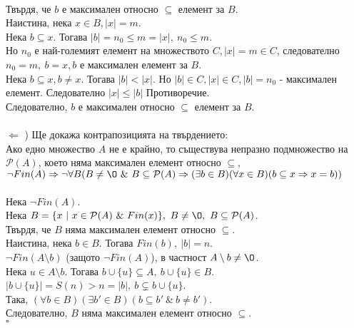 \documentclass[french]{article}
\begin{document}
	\\
	Твърдя, че $b$ е максимален относно $\subseteq$ елемент за $B$. \\
	Наистина, нека $x \in B, |x| = m$. \\ 
	Нека $b \subseteq x$. Тогава $|b| = n_0 \le m = |x|,\ n_0 \le m$. \\
	Но $n_0$ е най-големият елемент на множеството $C, |x| = m \in C$, следователно $n_0 = m,\ b = x, b$ е максимален елемент за $B$. \\
	Нека $b \subseteq x, b \not= x$. Тогава $|b| < |x|$. Но $|b| \in C, |x| \in C, |b| = n_0$ - максимален елемент. Следователно $|x| \le |b|$ Противоречие. \\
	Следователно, $b$ е максимален относно $\subseteq$ елемент за $B$. \\
    \\	
	$\Longleftarrow$ ) Ще докажа контрапозицията на твърдението: \\
	Ако едно множество $A$ не е крайно, то съществува непразно подмножество на $\mathcal{P}(A)$, което няма максимален елемент относно $\subseteq$, \\
	$\neg Fin(A) \Rightarrow \neg \forall B (B \not= {\O}\ \&\ B \subseteq \mathcal{P}(A) \Rightarrow (\exists b \in B)(\forall x \in B)(b \subseteq x \Rightarrow x = b))$ \\
	\\
	Нека $\neg Fin(A)$. \\
	Нека $B = \{x\ |\ x \in \mathcal{P}(A)\ \&\ Fin(x)\},\ B \not= {\O},\ B \subseteq \mathcal{P}(A)$. \\
	Твърдя, че $B$ няма максимален елемент относно $\subseteq$. \\
	Наистина, нека $b \in B$. Тогава $Fin(b),\ |b| = n$. \\
	$\neg Fin(A \setminus b)$ (защото $\neg Fin(A)$), в частност $A \setminus b \not= {\O}$. \\
	Нека $u \in A \setminus b.$ Тогава $b \cup \{u\} \subseteq A,\ b \cup \{u\} \in B$. \\
	$|b \cup \{u\}| = S(n) > n = |b|,\ b \subsetneq b \cup \{u\}$. \\
	Така, $(\forall b \in B)(\exists b' \in B)(b \subseteq b'\ \&\ b \not= b')$. \\
	Следователно, $B$ няма максимален елемент относно $\subseteq$. \\
	$\square$
	
	
\end{document}
